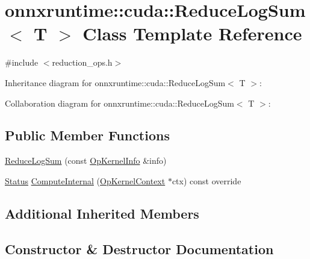 \hypertarget{classonnxruntime_1_1cuda_1_1ReduceLogSum}{}\section{onnxruntime\+:\+:cuda\+:\+:Reduce\+Log\+Sum$<$ T $>$ Class Template Reference}
\label{classonnxruntime_1_1cuda_1_1ReduceLogSum}


{\ttfamily \#include $<$reduction\+\_\+ops.\+h$>$}



Inheritance diagram for onnxruntime\+:\+:cuda\+:\+:Reduce\+Log\+Sum$<$ T $>$\+:


Collaboration diagram for onnxruntime\+:\+:cuda\+:\+:Reduce\+Log\+Sum$<$ T $>$\+:
\subsection*{Public Member Functions}
\begin{DoxyCompactItemize}
\item 
\mbox{\hyperlink{classonnxruntime_1_1cuda_1_1ReduceLogSum_a836a6cdded8cefaef16901be41a31954}{Reduce\+Log\+Sum}} (const \mbox{\hyperlink{classonnxruntime_1_1OpKernelInfo}{Op\+Kernel\+Info}} \&info)
\item 
\mbox{\hyperlink{classonnxruntime_1_1common_1_1Status}{Status}} \mbox{\hyperlink{classonnxruntime_1_1cuda_1_1ReduceLogSum_ac4051b87fd92e041fc6a4ef367565203}{Compute\+Internal}} (\mbox{\hyperlink{classonnxruntime_1_1OpKernelContext}{Op\+Kernel\+Context}} $\ast$ctx) const override
\end{DoxyCompactItemize}
\subsection*{Additional Inherited Members}


\subsection{Constructor \& Destructor Documentation}
\mbox{\label{classonnxruntime_1_1cuda_1_1ReduceLogSum_a836a6cdded8cefaef16901be41a31954}} 

